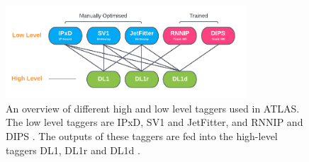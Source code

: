\begin{figure}[!htbp]
  \centering
  \includegraphics[width=0.8\textwidth]{chapters/3.tracking/figs/high_low_taggers.pdf}
  \caption{
    An overview of different high and low level taggers used in ATLAS.
    The low level taggers are IPxD, SV1 and JetFitter, and RNNIP and DIPS \cite{FTAG-2018-01,ATL-PHYS-PUB-2017-011,ATL-PHYS-PUB-2017-003,ATL-PHYS-PUB-2020-014}.
    The outputs of these taggers are fed into the high-level taggers DL1, DL1r and DL1d \cite{ATL-PHYS-PUB-2017-013,ATLAS:2022qxm}.
  }
  \label{fig:high_low_taggers}
\end{figure}